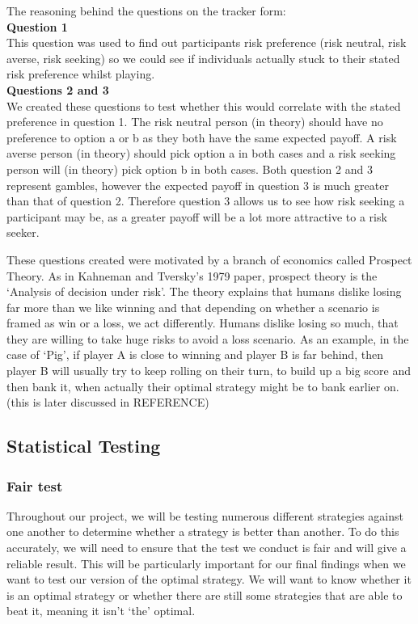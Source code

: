 \documentclass[a4paper,titlepage]{article}
\begin{document}
The reasoning behind the questions on the tracker form:\\
\textbf{Question 1}\\This question was used to find out participants risk preference (risk neutral, risk averse, risk seeking) so we could see if individuals actually stuck to their stated risk preference whilst playing.\\ \textbf{Questions 2 and 3}\\We created these questions to test whether this would correlate with the stated preference in question 1. The risk neutral person (in theory) should have no preference to option a or b as they both have the same expected payoff. A risk averse person (in theory) should pick option a in both cases and a risk seeking person will (in theory) pick option b in both cases. Both question 2 and 3 represent gambles, however the expected payoff in question 3 is much greater than that of question 2. Therefore question 3 allows us to see how risk seeking a participant may be, as a greater payoff will be a lot more attractive to a risk seeker.

These questions created were motivated by a branch of economics called Prospect Theory. As in Kahneman and Tversky’s 1979 paper, prospect theory is the ‘Analysis of decision under risk’\cite{kahneman2013prospect}. The theory explains that humans dislike losing far more than we like winning and that depending on whether a scenario is framed as win or a loss, we act differently. Humans dislike losing so much, that they are willing to take huge risks to avoid a loss scenario. As an example, in the case of ‘Pig’, if player A is close to winning and player B is far behind, then player B will usually try to keep rolling on their turn, to build up a big score and then bank it, when actually their optimal strategy might be to bank earlier on. (this is later discussed in REFERENCE)
\subsection{Statistical Testing}
\subsubsection{Fair test}
Throughout our project, we will be testing numerous different strategies against one another to determine whether a strategy is better than another. To do this accurately, we will need to ensure that the test we conduct is fair and will give a reliable result. This will be particularly important for our final findings when we want to test our version of the optimal strategy. We will want to know whether it is an optimal strategy or whether there are still some strategies that are able to beat it, meaning it isn’t `the' optimal.
\end{document}

